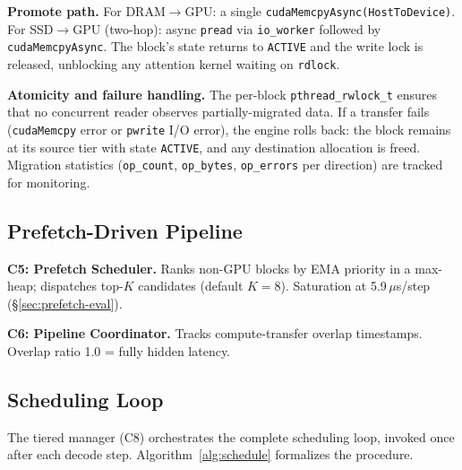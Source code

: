 \documentclass[conference]{IEEEtran}
\begin{document}
\textbf{Promote path.} For DRAM$\to$GPU: a single \texttt{cudaMemcpyAsync(HostToDevice)}. For SSD$\to$GPU (two-hop): async \texttt{pread} via \texttt{io\_worker} followed by \texttt{cudaMemcpyAsync}. The block's state returns to \texttt{ACTIVE} and the write lock is released, unblocking any attention kernel waiting on \texttt{rdlock}.

\textbf{Atomicity and failure handling.} The per-block \texttt{pthread\_rwlock\_t} ensures that no concurrent reader observes partially-migrated data. If a transfer fails (\texttt{cudaMemcpy} error or \texttt{pwrite} I/O error), the engine rolls back: the block remains at its source tier with state \texttt{ACTIVE}, and any destination allocation is freed. Migration statistics (\texttt{op\_count}, \texttt{op\_bytes}, \texttt{op\_errors} per direction) are tracked for monitoring.

\subsection{Prefetch-Driven Pipeline}
\label{sec:pipeline}


\textbf{C5: Prefetch Scheduler.} Ranks non-GPU blocks by EMA priority in a max-heap; dispatches top-$K$ candidates (default $K{=}8$). Saturation at 5.9\,$\mu$s/step (\S\ref{sec:prefetch-eval}).

\textbf{C6: Pipeline Coordinator.} Tracks compute-transfer overlap timestamps. Overlap ratio 1.0 = fully hidden latency.

\subsection{Scheduling Loop}

The tiered manager (C8) orchestrates the complete scheduling loop, invoked once after each decode step. Algorithm~\ref{alg:schedule} formalizes the procedure.
\end{document}
